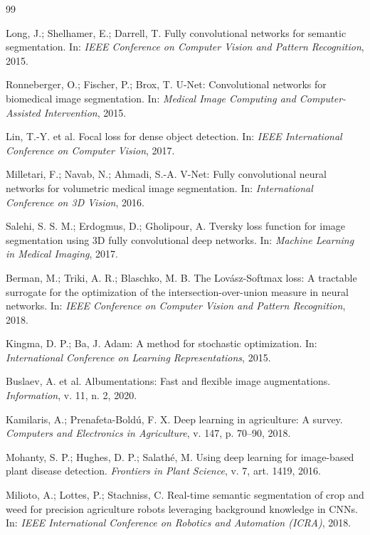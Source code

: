 \documentclass[10pt,a4paper,twocolumn]{article}
\begin{document}

\begin{thebibliography}{99}

Long, J.; Shelhamer, E.; Darrell, T.
Fully convolutional networks for semantic segmentation.
In: \textit{IEEE Conference on Computer Vision and Pattern Recognition}, 2015.

Ronneberger, O.; Fischer, P.; Brox, T.
U-Net: Convolutional networks for biomedical image segmentation.
In: \textit{Medical Image Computing and Computer-Assisted Intervention}, 2015.

Lin, T.-Y. et al.
Focal loss for dense object detection.
In: \textit{IEEE International Conference on Computer Vision}, 2017.

Milletari, F.; Navab, N.; Ahmadi, S.-A.
V-Net: Fully convolutional neural networks for volumetric medical image segmentation.
In: \textit{International Conference on 3D Vision}, 2016.

Salehi, S. S. M.; Erdogmus, D.; Gholipour, A.
Tversky loss function for image segmentation using 3D fully convolutional deep networks.
In: \textit{Machine Learning in Medical Imaging}, 2017.

Berman, M.; Triki, A. R.; Blaschko, M. B.
The Lovász-Softmax loss: A tractable surrogate for the optimization of the intersection-over-union measure in neural networks.
In: \textit{IEEE Conference on Computer Vision and Pattern Recognition}, 2018.

Kingma, D. P.; Ba, J.
Adam: A method for stochastic optimization.
In: \textit{International Conference on Learning Representations}, 2015.

Buslaev, A. et al.
Albumentations: Fast and flexible image augmentations.
\textit{Information}, v. 11, n. 2, 2020.

Kamilaris, A.; Prenafeta-Boldú, F. X.
Deep learning in agriculture: A survey.
\textit{Computers and Electronics in Agriculture}, v. 147, p. 70--90, 2018.

Mohanty, S. P.; Hughes, D. P.; Salathé, M.
Using deep learning for image-based plant disease detection.
\textit{Frontiers in Plant Science}, v. 7, art. 1419, 2016.

Milioto, A.; Lottes, P.; Stachniss, C.
Real-time semantic segmentation of crop and weed for precision agriculture robots leveraging background knowledge in CNNs.
In: \textit{IEEE International Conference on Robotics and Automation (ICRA)}, 2018.


\end{thebibliography}
\end{document}

